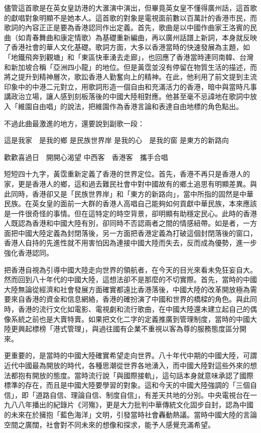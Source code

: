 儘管這首歌是在英女皇訪港的大滙演中演出，但畢竟英女皇不懂得廣州話，這首歌的獻唱對象明顯不是她本人。這首歌的對象是電視面前數以百萬計的香港市民，而歌詞的內容正正是要為香港認同作出定義。首先，歌曲是以中國作曲家王洛賓的民曲（如青春舞曲和康定情歌）為基礎重新編曲，再以廣州話譜上新詞，本身就反映了香港社會的華人文化基礎。歌詞方面，大多以香港當時的快速發展為主題，如「地鐵飛奔到觀塘」和「東區快車湧去走廊」，也回應了香港當時連同南韓、台灣和新加坡合稱「亞洲四小龍」的地位。但是黃霑並沒有停留在物質生活的描述，而將之提升到精神層次，歌訟香港人勤奮向上的精神。在此，他利用了前文提到主流印象中的中港二元對立，用歌詞形造一個自由和充滿活力的香港，暗中與當時凡事講政治立場，讓人感到刻板落後的中國大陸相對應。他甚至毫不忌諱地在歌詞中放入「維園自由唱」的說法，把維園作為香港言論和表達自由地標的角色點出。

不過此曲最激進的地方，還要說到副歌一段：

\begin{displayquote}
    這是我家　是我的鄉
    是民族世界岸
    是我的心　是我的窗
    是東方的新路向

    歡歡喜過日　開開心渴望
    中西客　香港客　攜手合唱
\end{displayquote}

短短四十九字，黃霑重新定義了香港的世界定位。首先，香港不再只是香港人的家，更是香港人的鄉，這和過去難民社會中對中國故有的鄉土追思有明顯差異。與此同時，香港卻又是「民族世界岸」和「東方的新路向」，當中所指的固然是中華民族。在英女皇的面前一大群的香港人高唱自己能夠如何貢獻中華民族，本來應該是一件很奇怪的事情。但在這特定的時空背景，卻明顯有助穩定民心。此時的香港人既認為香港和中國大陸有別，卻同時不否認兩者之間的情感紐帶。如是者，一方面把中國大陸定義為封閉落後，另一方面把香港定義為打破這個封閉落後的窗口，香港人自持的先進性就不用害怕因為連接中國大陸而失去，反而成為優勢，進一步強化香港認同。

把香港自視為引導中國大陸走向世界的領航者，在今天的目光來看未免狂妄自大。然而回到八十年代的中國大陸，這想法卻不是那麼的不切實際。首先，當時的中國大陸無論從經濟和社會發展方面確實都遠比香港落後，中國大陸的改革開放極為需要來自香港的資金和信息網絡，香港的確扮演了中國和世界的橋樑的角色。與此同時，香港的流行文化如電影、電視劇和流行歌曲，在中國大陸還未建立起自己的偶像系統之前也是大賣特賣。如果把文化二字的定義推廣到管理制度，當時的中國大陸更興起標榜「港式管理」，與過往國有企業不重視以客為尊的服務態度區分開來。

更重要的，是當時的中國大陸確實希望走向世界。八十年代中期的中國大陸，可謂近代中國最為開放的時代，各種思潮從世界各地湧入，而中國大陸對這些外來的想法都抱有開放的態度。當時流行說「與國際接軌」，這句話本身就意味承認了國際標準的存在，而且是中國大陸要學習的對象。這和今天的中國大陸強調的「三個自信」，即「道路自信、理論自信、制度自信」，有差天共地的分別。中央電視台在一九八八年播出的紀錄片《河殤》，更是大力批判中華傳統文化固步自封，認為中國的未來在於擁抱「藍色海洋」文明，引發當時社會轟動熱議。當時中國大陸的言論空間之廣闊，社會對不同未來的想像和探求，能予人感覺充滿希望。

